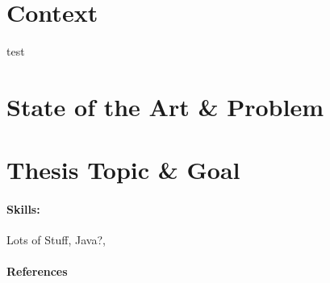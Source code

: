 \documentclass[12pt,oneside,openright]{report}
\newcommand{\skills}{Lots of Stuff, Java?,}
\begin{document}
\section*{Context}
test\cite{hendrickson2016serverless}
\section*{State of the Art \& Problem}

\section*{Thesis Topic \& Goal}

\paragraph{\textbf{Skills:}}\skills{}

\paragraph{\textbf{References}}
\printbibliography[heading=none]
\end{document}

